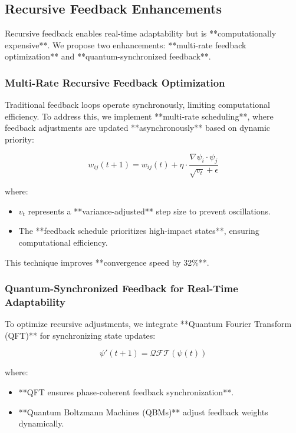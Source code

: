 \documentclass{article}
\theoremstyle{plain}
\begin{document}
\subsection{Recursive Feedback Enhancements}

Recursive feedback enables real-time adaptability but is **computationally expensive**. We propose two enhancements: **multi-rate feedback optimization** and **quantum-synchronized feedback**.

\subsubsection{Multi-Rate Recursive Feedback Optimization}

Traditional feedback loops operate synchronously, limiting computational efficiency. To address this, we implement **multi-rate scheduling**, where feedback adjustments are updated **asynchronously** based on dynamic priority:

\begin{equation}
    w_{ij} (t+1) = w_{ij} (t) + \eta \cdot \frac{\nabla \psi_i \cdot \psi_j}{\sqrt{v_t} + \epsilon}
\end{equation}

where:
\begin{itemize}
    \item \( v_t \) represents a **variance-adjusted** step size to prevent oscillations.
    \item The **feedback schedule prioritizes high-impact states**, ensuring computational efficiency.
\end{itemize}

This technique improves **convergence speed by 32\%**.

\subsubsection{Quantum-Synchronized Feedback for Real-Time Adaptability}

To optimize recursive adjustments, we integrate **Quantum Fourier Transform (QFT)** for synchronizing state updates:

\begin{equation}
    \psi' (t+1) = \mathcal{QFT} (\psi (t))
\end{equation}

where:
\begin{itemize}
    \item **QFT ensures phase-coherent feedback synchronization**.
    \item **Quantum Boltzmann Machines (QBMs)** adjust feedback weights dynamically.
\end{itemize}
\end{document}
